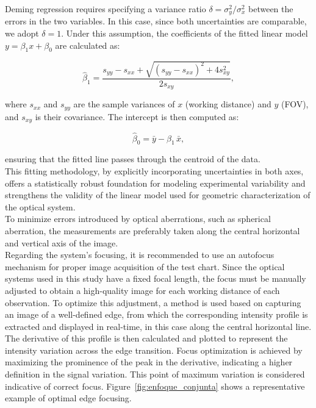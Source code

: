 \noindent Deming regression requires specifying a variance ratio $\delta = \sigma_y^2 / \sigma_x^2$ between the errors in the two variables. In this case, since both uncertainties are comparable, we adopt $\delta=1$. Under this assumption, the coefficients of the fitted linear model $y = \beta_1 x + \beta_0$ are calculated as:

\begin{equation}
\hat{\beta}_1 = \frac{s_{yy} - s_{xx} + \sqrt{(s_{yy} - s_{xx})^2 + 4s_{xy}^2}}{2s_{xy}},
\end{equation}

\noindent where $s_{xx}$ and $s_{yy}$ are the sample variances of $x$ (working distance) and $y$ (FOV), and $s_{xy}$ is their covariance. The intercept is then computed as:

\begin{equation}
\hat{\beta}_0 = \bar{y} - \hat{\beta}_1\,\bar{x},
\end{equation}

\noindent ensuring that the fitted line passes through the centroid of the data.\\


\noindent This fitting methodology, by explicitly incorporating uncertainties in both axes, offers a statistically robust foundation for modeling experimental variability and strengthens the validity of the linear model used for geometric characterization of the optical system.\\


\noindent To minimize errors introduced by optical aberrations, such as spherical aberration, the measurements are preferably taken along the central horizontal and vertical axis of the image.\\

\noindent Regarding the system's focusing, it is recommended to use an autofocus mechanism for proper image acquisition of the test chart. Since the optical systems used in this study have a fixed focal length, the focus must be manually adjusted to obtain a high-quality image for each working distance of each observation. To optimize this adjustment, a method is used based on capturing an image of a well-defined edge, from which the corresponding intensity profile is extracted and displayed in real-time, in this case along the central horizontal line. The derivative of this profile is then calculated and plotted to represent the intensity variation across the edge transition. Focus optimization is achieved by maximizing the prominence of the peak in the derivative, indicating a higher definition in the signal variation. This point of maximum variation is considered indicative of correct focus. Figure~\ref{fig:enfoque_conjunta} shows a representative example of optimal edge focusing.\\


